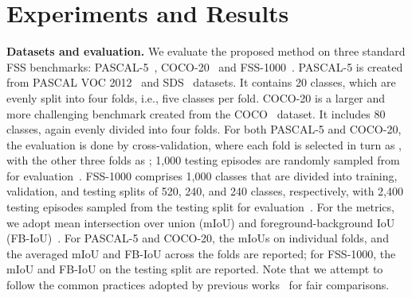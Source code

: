 \documentclass[runningheads,table,xcdraw]{llncs}
\begin{document}
\section{Experiments and Results}
\label{sec:exper}

\textbf{Datasets and evaluation.}
We evaluate the proposed method on three standard FSS benchmarks: PASCAL-5~\cite{shaban2017one}, COCO-20~\cite{nguyen2019feature} and FSS-1000~\cite{li2020fss}.
PASCAL-5 is created from PASCAL VOC 2012~\cite{everingham2010pascal}
and SDS~\cite{hariharan2014simultaneous} datasets.
It contains 20 classes, which are evenly split into four folds, i.e., five classes per fold.
COCO-20 is a larger and more challenging benchmark created from the COCO~\cite{lin2014microsoft} dataset.
It includes 80 classes, again evenly divided into four folds.
For both PASCAL-5 and COCO-20, the evaluation is done by cross-validation, where each fold is selected in turn as , with the other three folds as ;
1,000 testing episodes are randomly sampled from  for evaluation~\cite{min2021hypercorrelation}.
FSS-1000 \cite{li2020fss} comprises 1,000 classes that are divided into training, validation, and testing splits of 520, 240, and 240 classes, respectively, with 2,400 testing episodes sampled from the testing split for evaluation~\cite{min2021hypercorrelation}.
For the metrics, we adopt mean intersection over union (mIoU) and foreground-background IoU (FB-IoU)~\cite{min2021hypercorrelation}.
For PASCAL-5 and COCO-20, the mIoUs on individual folds, and the averaged mIoU and FB-IoU across the folds are reported;
for FSS-1000, the mIoU and FB-IoU on the testing split are reported.
Note that we attempt to follow the common practices adopted by previous works~\cite{min2021hypercorrelation,nguyen2019feature,tian2020prior,zhang2021few}
for fair comparisons.
\end{document}

